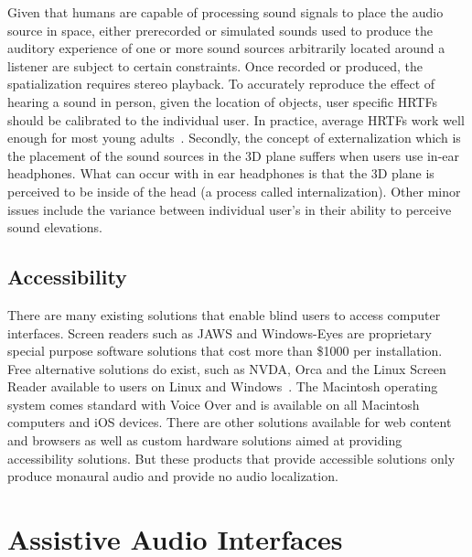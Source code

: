 Given that humans are capable of processing sound signals to place the audio
source in space, either prerecorded or simulated sounds used to produce the
auditory experience of one or more sound sources arbitrarily located around a
listener are subject to certain constraints. Once recorded or produced, the
spatialization requires stereo playback. To accurately reproduce the effect of
hearing a sound in person, given the location of objects, user specific HRTFs
should be calibrated to the individual user. In practice, average HRTFs work
well enough for most young adults~\cite{wenzel1993localization}. Secondly, the
concept of externalization which is the placement of the sound sources in the 3D
plane suffers when users use in-ear headphones. What can occur with in ear
headphones is that the 3D plane is perceived to be inside of the head (a process
called internalization). Other minor issues include the variance between
individual user's in their ability to perceive sound elevations.


\subsection{                  Accessibility                                   }

There are many existing solutions that enable blind users to access computer
interfaces. Screen readers such as JAWS and Windows-Eyes are proprietary special
purpose software solutions that cost more than \$1000 per installation. Free
alternative solutions do exist, such as NVDA, Orca and the Linux Screen Reader
available to users on Linux and Windows~\cite{bigham2008webanywhere}. The
Macintosh operating system comes standard with Voice Over and is available on
all Macintosh computers and iOS devices. There are other solutions available for
web content and browsers as well as custom hardware solutions aimed at
providing accessibility solutions. But these products that provide accessible
solutions only produce monaural audio and provide no audio localization.

\section{                 Assistive Audio Interfaces                           }

